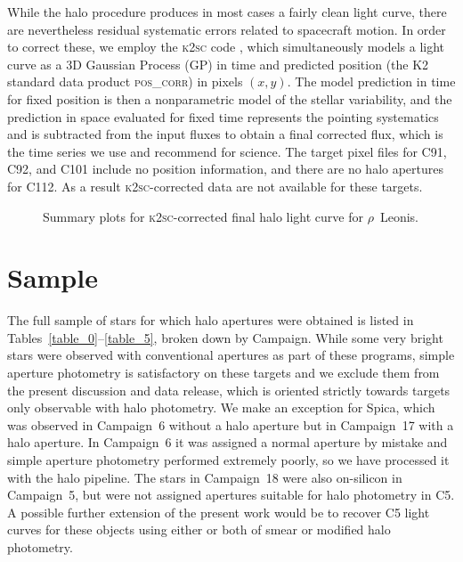 \documentclass[modern]{aastex62}
\begin{document}
While the halo procedure produces in most cases a fairly clean light curve, there are nevertheless residual systematic errors related to spacecraft motion. In order to correct these, we employ the \textsc{k2sc} code \citep{Aigrain2015,k2sc}, which simultaneously models a light curve as a 3D Gaussian Process (GP) in time and predicted position (the K2 standard data product \textsc{pos\_corr}) in pixels $(x,y)$. The model prediction in time for fixed position is then a nonparametric model of the stellar variability, and the prediction in space evaluated for fixed time represents the pointing systematics and is subtracted from the input fluxes to obtain a final corrected flux, which is the time series we use and recommend for science. The target pixel files for C91, C92, and C101 include no position information, and there are no halo apertures for C112. As a result \textsc{k2sc}-corrected data are not available for these targets.


\begin{figure*}
\caption{Summary plots for \textsc{k2sc}-corrected final halo light curve for $\rho$~Leonis.}
\end{figure*}




\section{Sample}
\label{sec:sample}


The full sample of stars for which halo apertures were obtained is listed in Tables~\ref{table_0}--\ref{table_5}, broken down by Campaign. While some very bright stars were observed with conventional apertures as part of these programs, simple aperture photometry is satisfactory on these targets and we exclude them from the present discussion and data release, which is oriented strictly towards targets only observable with halo photometry. We make an exception for Spica, which was observed in Campaign~6 without a halo aperture but in Campaign~17 with a halo aperture. In Campaign~6 it was assigned a normal aperture by mistake and simple aperture photometry performed extremely poorly, so we have processed it with the halo pipeline. The stars in Campaign~18 were also on-silicon in Campaign~5, but were not assigned apertures suitable for halo photometry in C5. A possible further extension of the present work would be to recover C5 light curves for these objects using either or both of smear or modified halo photometry.
\end{document}
